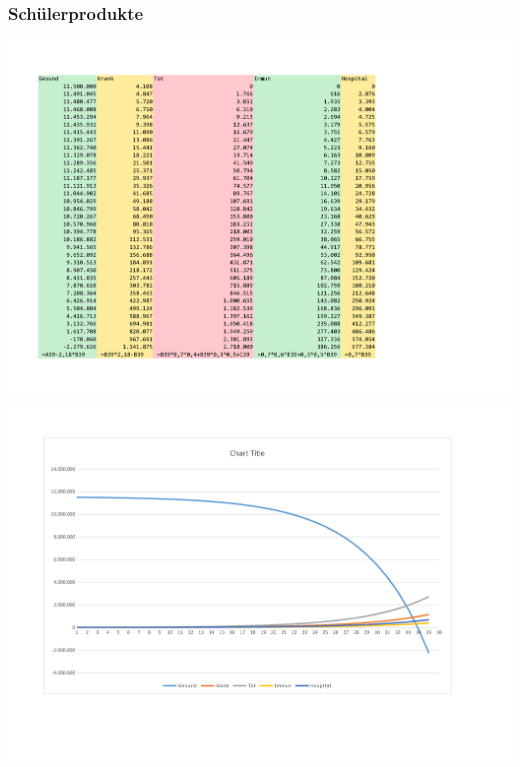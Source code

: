 \subsubsection*{Schülerprodukte}
\includegraphics[width=\textwidth]{projekt/leistung_2_1}
\includegraphics[width=\textwidth]{projekt/leistung_2_2}
